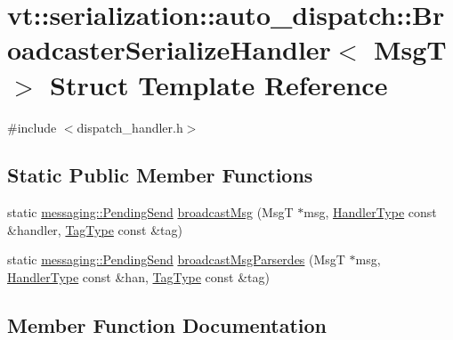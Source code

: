 \hypertarget{structvt_1_1serialization_1_1auto__dispatch_1_1_broadcaster_serialize_handler}{}\section{vt\+:\+:serialization\+:\+:auto\+\_\+dispatch\+:\+:Broadcaster\+Serialize\+Handler$<$ MsgT $>$ Struct Template Reference}
\label{structvt_1_1serialization_1_1auto__dispatch_1_1_broadcaster_serialize_handler}


{\ttfamily \#include $<$dispatch\+\_\+handler.\+h$>$}

\subsection*{Static Public Member Functions}
\begin{DoxyCompactItemize}
\item 
static \hyperlink{structvt_1_1messaging_1_1_pending_send}{messaging\+::\+Pending\+Send} \hyperlink{structvt_1_1serialization_1_1auto__dispatch_1_1_broadcaster_serialize_handler_ac96d96bd342624e11be009578f4676e1}{broadcast\+Msg} (MsgT $\ast$msg, \hyperlink{namespacevt_af64846b57dfcaf104da3ef6967917573}{Handler\+Type} const \&handler, \hyperlink{namespacevt_a84ab281dae04a52a4b243d6bf62d0e52}{Tag\+Type} const \&tag)
\item 
static \hyperlink{structvt_1_1messaging_1_1_pending_send}{messaging\+::\+Pending\+Send} \hyperlink{structvt_1_1serialization_1_1auto__dispatch_1_1_broadcaster_serialize_handler_a0d8d668c01e0fff7ef3334cbc16e079a}{broadcast\+Msg\+Parserdes} (MsgT $\ast$msg, \hyperlink{namespacevt_af64846b57dfcaf104da3ef6967917573}{Handler\+Type} const \&han, \hyperlink{namespacevt_a84ab281dae04a52a4b243d6bf62d0e52}{Tag\+Type} const \&tag)
\end{DoxyCompactItemize}


\subsection{Member Function Documentation}
\mbox{\label{structvt_1_1serialization_1_1auto__dispatch_1_1_broadcaster_serialize_handler_ac96d96bd342624e11be009578f4676e1}} 
